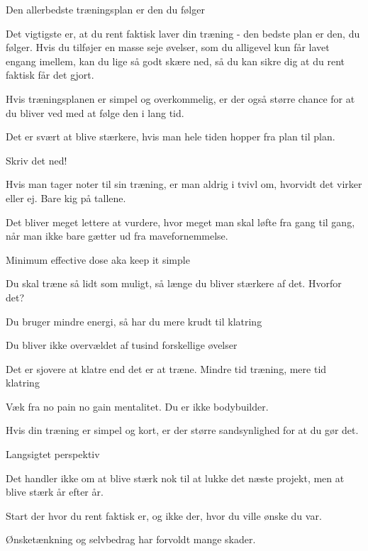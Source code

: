 \begin{multicols}{2}
  \begin{tList}{Den allerbedste træningsplan er den du følger}
  \item Det vigtigste er, at du rent faktisk laver din træning - den
    bedste plan er den, du følger. Hvis du tilføjer en masse seje
    øvelser, som du alligevel kun får lavet engang imellem, kan du
    lige så godt skære ned, så du kan sikre dig at du rent faktisk
    får det gjort.
  \item Hvis træningsplanen er simpel og overkommelig, er der også
    større chance for at du bliver ved med at følge den i lang tid.
  \item  Det er svært at blive stærkere, hvis man hele tiden hopper
    fra plan til plan.
  \end{tList}

  \begin{tList}{Skriv det ned!}
  \item Hvis man tager noter til sin træning, er man aldrig i tvivl
    om, hvorvidt det virker eller ej. Bare kig på tallene.
  \item Det bliver meget lettere at vurdere, hvor meget man skal
    løfte fra gang til gang, når man ikke bare gætter ud fra mavefornemmelse.
  \end{tList}

  \begin{tList}{Minimum effective dose aka keep it simple}
  \item Du skal træne så lidt som muligt, så længe du bliver stærkere
    af det. Hvorfor det?

  \item Du bruger mindre energi, så har du mere krudt til klatring
  \item Du bliver ikke overvældet af tusind forskellige øvelser
  \item Det er sjovere at klatre end det er at træne. Mindre tid
    træning, mere tid klatring

  \item Væk fra no pain no gain mentalitet. Du er ikke bodybuilder.
  \item Hvis din træning er simpel og kort, er der større
    sandsynlighed for at du gør det.
  \end{tList}

  \begin{tList}{Langsigtet perspektiv}
  \item Det handler ikke om at blive stærk nok til at lukke det næste
    projekt, men at blive stærk år efter år.
  \item Start der hvor du rent faktisk er, og ikke der, hvor du ville
    ønske du var.

  \item Ønsketænkning og selvbedrag har forvoldt mange skader.
  \end{tList}

\end{multicols}
